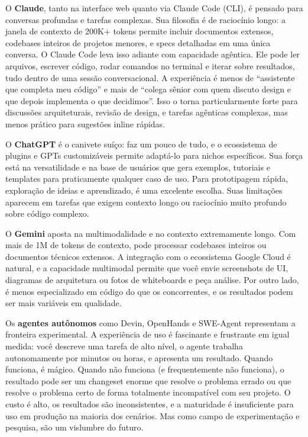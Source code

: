 O \textbf{Claude}, tanto na interface web quanto via Claude Code (CLI), é pensado para
conversas profundas e tarefas complexas. Sua filosofia é de raciocínio longo: a janela
de contexto de 200K+ tokens permite incluir documentos extensos, codebases inteiros de
projetos menores, e specs detalhadas em uma única conversa. O Claude Code leva isso
adiante com capacidade agêntica. Ele pode ler arquivos, escrever código, rodar
comandos no terminal e iterar sobre resultados, tudo dentro de uma sessão
conversacional. A experiência é menos de ``assistente que completa meu código'' e mais
de ``colega sênior com quem discuto design e que depois implementa o que decidimos''.
Isso o torna particularmente forte para discussões arquiteturais, revisão de design,
e tarefas agênticas complexas, mas menos prático para sugestões inline rápidas.

O \textbf{ChatGPT} é o canivete suíço: faz um pouco de tudo, e o ecossistema de
plugins e GPTs customizáveis permite adaptá-lo para nichos específicos. Sua força está
na versatilidade e na base de usuários que gera exemplos, tutoriais e templates para
praticamente qualquer caso de uso. Para prototipagem rápida, exploração de ideias e
aprendizado, é uma excelente escolha. Suas limitações aparecem em tarefas que exigem
contexto longo ou raciocínio muito profundo sobre código complexo.

O \textbf{Gemini} aposta na multimodalidade e no contexto extremamente longo. Com
mais de 1M de tokens de contexto, pode processar codebases inteiros ou documentos
técnicos extensos. A integração com o ecossistema Google Cloud é natural, e a
capacidade multimodal permite que você envie screenshots de UI, diagramas de
arquitetura ou fotos de whiteboards e peça análise. Por outro lado, é menos
especializado em código do que os concorrentes, e os resultados podem ser mais
variáveis em qualidade.

Os \textbf{agentes autônomos} como Devin, OpenHands e SWE-Agent representam a
fronteira experimental. A experiência de uso é fascinante e frustrante em igual
medida: você descreve uma tarefa de alto nível, o agente trabalha autonomamente por
minutos ou horas, e apresenta um resultado. Quando funciona, é mágico. Quando não
funciona (e frequentemente não funciona), o resultado pode ser um changeset
enorme que resolve o problema errado ou que resolve o problema certo de forma
totalmente incompatível com seu projeto. O custo é alto, os resultados são
inconsistentes, e a maturidade é insuficiente para uso em produção na maioria
dos cenários. Mas como campo de experimentação e pesquisa, são um vislumbre do
futuro.

